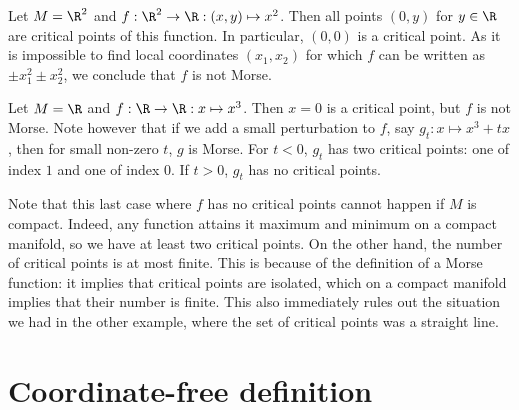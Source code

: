 \begin{marginfigure}
    \centering
    \caption{An example of an embedding where the height function is not Morse.}
    \label{fig:non-example-of-morse-function}
\end{marginfigure}
\begin{noneg}
    Let $M = \R^2$ and $f: \R^2 \to  \R: (x, y) \mapsto  x^2$.
    Then all points $(0, y)$ for  $y \in \R$ are critical points of this function.
    In particular, $(0, 0)$ is a critical point.
    As it is impossible to find local coordinates $(x_1, x_2)$ for which $f$ can be written as $\pm x_1^2 \pm x_2^2$, we conclude that $f$ is not Morse.
\end{noneg}
\begin{marginfigure}
    \centering
    \caption{An example of a function that is not Morse: $f: \R \to  \R: x \mapsto  x^3$.
        Small perturbations of $f$ are Morse.
    }
    \label{fig:non-examples-of-morse-functions}
\end{marginfigure}
\begin{noneg}
    Let $M = \R$ and $f : \R \to  \R: x \mapsto x^3$.
    Then $x = 0$ is a critical point, but $f$ is not Morse.
    Note however that if we add a small perturbation to $f$, say $g_t: x\mapsto x^3+ tx$, then for small non-zero $t$, $g$ is Morse. For $t < 0$, $g_t$  has two critical points: one of index $1$ and one of index $0$.
    If $t > 0$,  $g_t$ has no critical points.
    \label{eg:cube}
\end{noneg}

Note that this last case where $f$ has no critical points cannot happen if $M$ is compact.
Indeed, any function attains it maximum and minimum on a compact manifold, so we have at least two critical points.
On the other hand, the number of critical points is at most finite.
This is because of the definition of a Morse function: it implies that critical points are isolated, which on a compact manifold implies that their number is finite.
This also immediately rules out the situation we had in the other example, where the set of critical points was a straight line.

\section{Coordinate-free definition}

